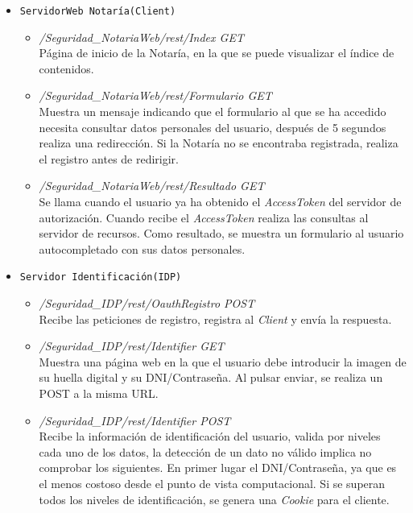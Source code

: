 \documentclass[a4,12pt,onecolum]{article}
\begin{document}
\begin{itemize}
\item \texttt{ServidorWeb Notaría(Client)}
	\begin{itemize}
		\item \emph{/Seguridad\_NotariaWeb/rest/Index	GET} \\
		Página de inicio de la Notaría, en la que se puede visualizar el índice de contenidos.

		\item \emph{/Seguridad\_NotariaWeb/rest/Formulario	GET} \\
		Muestra un mensaje indicando que el formulario al que se ha accedido necesita consultar datos 					personales del usuario, después de 5 segundos realiza una redirección. Si la Notaría no se encontraba 			registrada, realiza el registro antes de redirigir.

		\item \emph{/Seguridad\_NotariaWeb/rest/Resultado	GET} \\
		Se llama cuando el usuario ya ha obtenido el \emph{AccessToken} del servidor de autorización. Cuando 			recibe el \emph{AccessToken} realiza las consultas al servidor de recursos. Como resultado, se muestra 			un formulario al usuario autocompletado con sus datos personales.
	\end{itemize}

\item \texttt{Servidor Identificación(IDP)}
	\begin{itemize}
		\item \emph{/Seguridad\_IDP/rest/OauthRegistro	POST} \\
		Recibe las peticiones de registro, registra al \emph{Client} y envía la respuesta.

		\item \emph{/Seguridad\_IDP/rest/Identifier	GET} \\
		Muestra una página web en la que el usuario debe introducir la imagen de su huella digital y su DNI/Contraseña. Al pulsar enviar, se realiza un POST a la misma URL.

		\item \emph{/Seguridad\_IDP/rest/Identifier	POST} \\
		Recibe la información de identificación del usuario, valida por niveles cada uno de los datos, la detección de un dato no válido implica no comprobar los siguientes. En primer lugar el DNI/Contraseña, ya que es el menos costoso desde el punto de vista computacional.
		Si se superan todos los niveles de identificación, se genera una \emph{Cookie} para el cliente.


\end{itemize}
\end{itemize}
\end{document}

